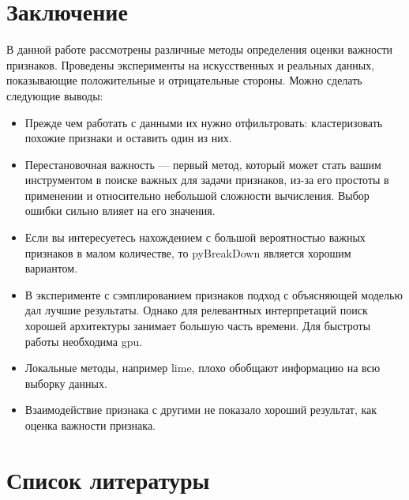 \documentclass[12pt]{article}
\begin{document}
\section{Заключение}
В данной работе рассмотрены различные методы определения оценки важности признаков. Проведены эксперименты на искусственных и реальных данных, показывающие положительные и отрицательные стороны. Можно сделать следующие выводы:
\begin{itemize}
    \item Прежде чем работать с данными их нужно отфильтровать: кластеризовать похожие признаки и оставить один из них.
    \item Перестановочная важность --- первый метод, который может стать вашим инструментом в поиске важных для задачи признаков, из-за его простоты в применении и относительно небольшой сложности вычисления. Выбор ошибки сильно влияет на его значения.
    \item Если вы интересуетесь нахождением с большой вероятностью важных признаков в малом количестве, то pyBreakDown является хорошим вариантом.
    \item В эксперименте с сэмплированием признаков подход с объясняющей моделью дал лучшие результаты. Однако для релевантных интерпретаций поиск хорошей архитектуры занимает большую часть времени. Для быстроты работы необходима gpu.
    \item Локальные методы, например lime, плохо обобщают информацию на всю выборку данных.
    \item Взаимодействие признака с другими не показало хороший результат, как оценка важности признака.
\end{itemize}


\newpage
\section{Список литературы}
\vspace{-1cm}
% 

\newpage

\end{document}
